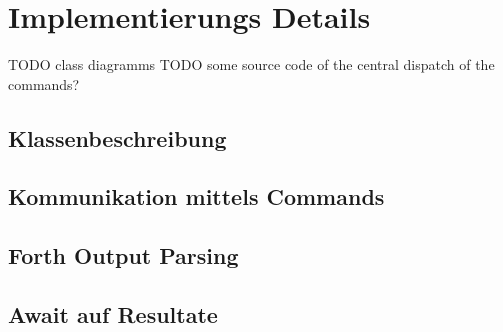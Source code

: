 \section{Implementierungs Details}

TODO class diagramms
TODO some source code of the central dispatch of the commands?

\subsection{Klassenbeschreibung}

\subsection{Kommunikation mittels Commands}

\subsection{Forth Output Parsing}

\subsection{Await auf Resultate}

